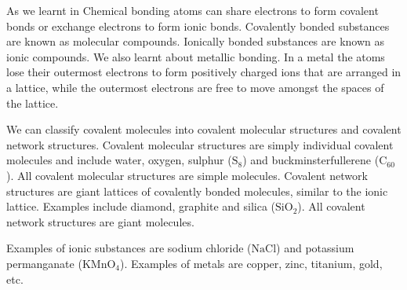       \label{m38120*eip-819}As we learnt in Chemical bonding atoms can share electrons to form covalent bonds or exchange electrons to form ionic bonds. Covalently bonded substances are known as molecular compounds. Ionically bonded substances are known as ionic compounds. We also learnt about metallic bonding. In a metal the atoms lose their outermost electrons to form positively charged ions that are arranged in a lattice, while the outermost electrons are free to move amongst the spaces of the lattice. \par \label{m38120*eip-394}We can classify covalent molecules into covalent molecular structures and covalent network structures. Covalent molecular structures are simply individual covalent molecules and include water, oxygen, sulphur (${\mathrm{S}}_{8}$) and buckminsterfullerene (${\mathrm{C}}_{60}$). All covalent molecular structures are simple molecules. Covalent network structures are giant lattices of covalently bonded molecules, similar to the ionic lattice. Examples include diamond, graphite and silica (${\mathrm{SiO}}_{2}$). All covalent network structures are giant molecules.\par \label{m38120*eip-860}Examples of ionic substances are sodium chloride ($\mathrm{NaCl}$) and potassium permanganate (${\mathrm{KMnO}}_{4}$). Examples of metals are copper, zinc, titanium, gold, etc.\par \label{m38120*uid1}
